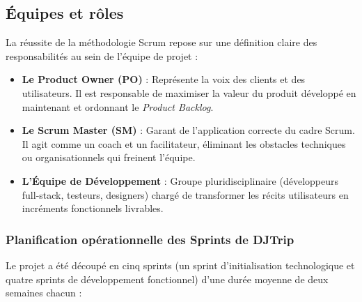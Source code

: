 \documentclass[12pt,a4paper]{report}
\begin{document}
\subsection{Équipes et rôles}
La réussite de la méthodologie Scrum repose sur une définition claire des responsabilités au sein de l'équipe de projet :
\begin{itemize}[label=\textbullet]
    \item \textbf{Le Product Owner (PO)} : Représente la voix des clients et des utilisateurs. Il est responsable de maximiser la valeur du produit développé en maintenant et ordonnant le \textit{Product Backlog}.
    \item \textbf{Le Scrum Master (SM)} : Garant de l'application correcte du cadre Scrum. Il agit comme un coach et un facilitateur, éliminant les obstacles techniques ou organisationnels qui freinent l'équipe.
    \item \textbf{L’Équipe de Développement} : Groupe pluridisciplinaire (développeurs full-stack, testeurs, designers) chargé de transformer les récits utilisateurs en incréments fonctionnels livrables.
\end{itemize}

\subsubsection{Planification opérationnelle des Sprints de DJTrip}
Le projet a été découpé en cinq sprints (un sprint d'initialisation technologique et quatre sprints de développement fonctionnel) d'une durée moyenne de deux semaines chacun :
\end{document}
